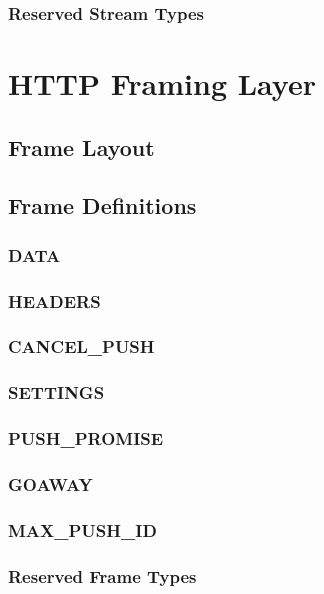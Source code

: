 \documentclass{article}
\begin{document}
\subsubsection{Reserved Stream Types}

\section{HTTP Framing Layer}

\subsection{Frame Layout}

\subsection{Frame Definitions}

\subsubsection{DATA}

\subsubsection{HEADERS}

\subsubsection{CANCEL\_PUSH}

\subsubsection{SETTINGS}

\subsubsection{PUSH\_PROMISE}

\subsubsection{GOAWAY}

\subsubsection{MAX\_PUSH\_ID}

\subsubsection{Reserved Frame Types}
\end{document}
